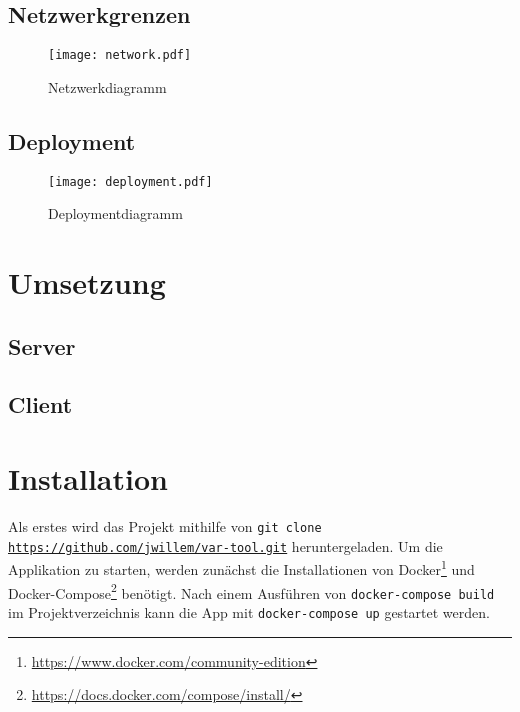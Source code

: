 \subsection{Netzwerkgrenzen}
\blindtext
  \begin{figure}[h]
    \centering
    \texttt{[image: network.pdf]}
    \par
    \caption{Netzwerkdiagramm}
    \label{fig:network}
  \end{figure}
\subsection{Deployment}
\blindtext
\begin{landscape}
  \begin{figure}[h]
    \centering
    \texttt{[image: deployment.pdf]}
    \par
    \caption{Deploymentdiagramm}
    \label{fig:deployment}
  \end{figure}
\end{landscape}
\section{Umsetzung}
\blindtext
\subsection{Server}
\blindtext
\blindtext
\blindtext
\subsection{Client}
\blindtext
\blindtext
\blindtext
\section{Installation}
Als erstes wird das Projekt mithilfe von \texttt{git clone \url{https://github.com/jwillem/var-tool.git}} heruntergeladen.
Um die Applikation zu starten, werden zunächst die Installationen von Docker\footnote{\url{https://www.docker.com/community-edition}} und Docker-Compose\footnote{\url{https://docs.docker.com/compose/install/}} benötigt.
Nach einem Ausführen von \texttt{docker-compose build} im Projektverzeichnis kann die App mit \texttt{docker-compose up} gestartet werden.
